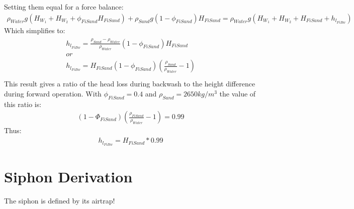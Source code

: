 \documentclass[letterpaper,10pt,english]{sphinxmanual}
\begin{document}
Setting them equal for a force balance:
\begin{equation}\label{equation:Filtration/Filtration_Derivations:Filtration/Filtration_Derivations:2}
\begin{split}\rho_{Water} g \left( H_{W_1} + H_{W_2} + \phi_{FiSand} H_{FiSand} \right) + \rho_{Sand} g \left( 1 - \phi_{FiSand} \right) H_{FiSand} = \rho_{Water} g \left( H_{W_1} + H_{W_2} + H_{FiSand} + h_{l_{FiBw}} \right)\end{split}
\end{equation}
Which simplifies to:
\begin{align}\label{equation:Filtration/Filtration_Derivations:Filtration/Filtration_Derivations:3}\!\begin{aligned}
h_{l_{FiBw}} = \frac{\rho_{Sand} - \rho_{Water}}{\rho_{Water}} \left( 1 - \phi_{FiSand} \right) H_{FiSand}\\
or\\
h_{l_{FiBw}} = H_{FiSand} \left( 1 - \phi_{FiSand} \right)  \left( \frac{\rho_{Sand}}{\rho_{Water}} - 1 \right)\\
\end{aligned}\end{align}
This result gives a ratio of the head loss during backwash to the height difference during forward operation. With \(\phi_{FiSand} = 0.4\) and \(\rho_{Sand} = 2650 kg/m^3\) the value of this ratio is:
\begin{equation}\label{equation:Filtration/Filtration_Derivations:Filtration/Filtration_Derivations:4}
\begin{split}\left( 1- \Phi_{FiSand} \right) \left( \frac{\rho_{FiSand}}{\rho_{Water}} - 1 \right) = 0.99\end{split}
\end{equation}
Thus:
\begin{equation}\label{equation:Filtration/Filtration_Derivations:Filtration/Filtration_Derivations:5}
\begin{split}h_{l_{FiBw}} = H_{FiSand} * 0.99\end{split}
\end{equation}

\section{Siphon Derivation}
\label{\detokenize{Filtration/Filtration_Derivations:siphon-derivation}}\label{\detokenize{Filtration/Filtration_Derivations:id1}}
The siphon is defined by its airtrap!
\end{document}
